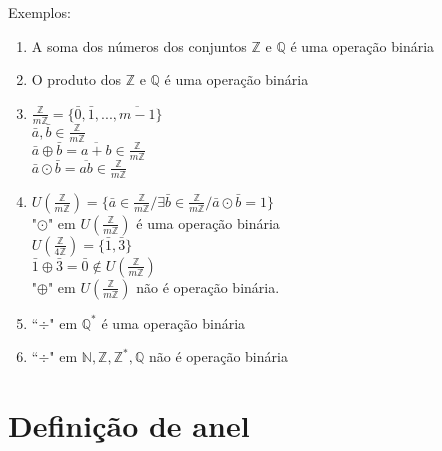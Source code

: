 Exemplos:
\begin{enumerate}
\item A soma dos n{\'u}meros dos conjuntos $\mathbb{Z}$ e $\mathbb{Q}$ {\'e} uma opera{\c c}{\~a}o bin{\'a}ria
\item O produto dos $\mathbb{Z}$ e $\mathbb{Q}$ {\'e} uma opera{\c c}{\~a}o bin{\'a}ria
\item $\displaystyle\frac{\mathbb{Z}}{m\mathbb{Z}}=\{\bar{0},\bar{1},...,\overline{m-1}\}$\\
$\bar{a},\bar{b}\in\displaystyle\frac{\mathbb{Z}}{m\mathbb{Z}}$\\
$\bar{a}\oplus\bar{b}=\overline{a+b}\in\displaystyle\frac{\mathbb{Z}}{m\mathbb{Z}}$\\
$\bar{a}\odot\bar{b}=\overline{ab}\in\displaystyle\frac{\mathbb{Z}}{m\mathbb{Z}}$
\item $U(\displaystyle\frac{\mathbb{Z}}{m\mathbb{Z}})=\{\bar{a}\in\displaystyle\frac{\mathbb{Z}}{m\mathbb{Z}}/\exists\bar{b}\in\displaystyle\frac{\mathbb{Z}}{m\mathbb{Z}}/\bar{a}\odot\bar{b}=1\}$\\
"$\odot$" em $U(\displaystyle\frac{\mathbb{Z}}{m\mathbb{Z}})$ {\'e}  uma opera{\c c}{\~a}o bin{\'a}ria\\
$U(\displaystyle\frac{\mathbb{Z}}{4\mathbb{Z}})=\{\bar{1},\bar{3}\}$\\
$\bar{1}\oplus\bar{3}=\bar{0}\notin U(\displaystyle\frac{\mathbb{Z}}{m\mathbb{Z}})$\\
"$\oplus$" em $U(\displaystyle\frac{\mathbb{Z}}{m\mathbb{Z}})$ n{\~a}o {\'e} opera{\c c}{\~a}o bin{\'a}ria.
\item ``$\div$" em $\mathbb{Q}^{*}$ {\'e} uma opera{\c c}{\~a}o bin{\'a}ria
\item ``$\div$" em $\mathbb{N}, \mathbb{Z}, \mathbb{Z}^{*}, \mathbb{Q}$ n{\~a}o {\'e} opera{\c c}{\~a}o bin{\'a}ria

\end{enumerate}

\section{Defini{\c c}{\~a}o de anel}


